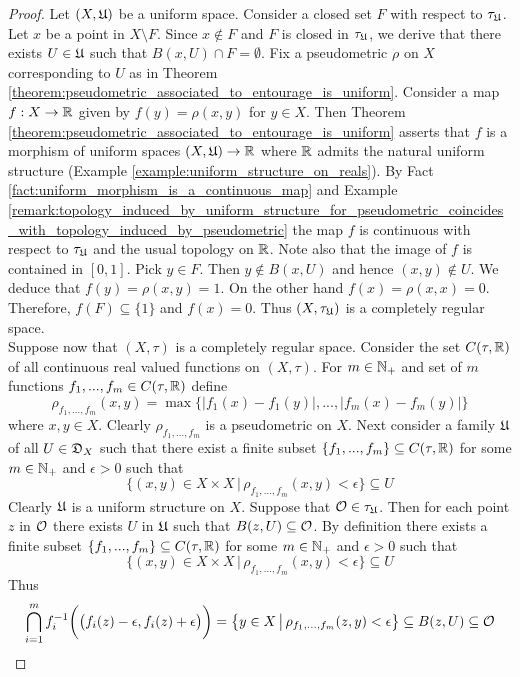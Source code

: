 \begin{proof}
Let $(X,{\mathfrak U})$ be a uniform space. Consider a closed set $F$ with respect to $\tau_{{\mathfrak U}}$. Let $x$ be a point in $X\setminus F$. Since $x \not \in F$ and $F$ is closed in $\tau_{{\mathfrak U}}$, we derive that there exists $U \in {\mathfrak U}$ such that $B(x,U)\cap F = \emptyset$. Fix a pseudometric $\rho$ on $X$ corresponding to $U$ as in Theorem \ref{theorem:pseudometric_associated_to_entourage_is_uniform}. Consider a map $f:X\rightarrow {\mathbb R}$ given by $f(y) = \rho(x,y)$ for $y\in X$. Then Theorem \ref{theorem:pseudometric_associated_to_entourage_is_uniform} asserts that $f$ is a morphism of uniform spaces $\left(X,{\mathfrak U}\right)\rightarrow {\mathbb R}$ where ${\mathbb R}$ admits the natural uniform structure (Example \ref{example:uniform_structure_on_reals}). By Fact \ref{fact:uniform_morphism_is_a_continuous_map} and Example \ref{remark:topology_induced_by_uniform_structure_for_pseudometric_coincides_with_topology_induced_by_pseudometric} the map $f$ is continuous with respect to $\tau_{{\mathfrak U}}$ and the usual topology on ${\mathbb R}$. Note also that the image of $f$ is contained in $[0,1]$. Pick $y\in F$. Then $y \not \in B(x,U)$ and hence $(x,y) \not \in U$. We deduce that $f(y) = \rho(x,y) = 1$. On the other hand $f(x) = \rho(x,x) = 0$. Therefore, $f(F) \subseteq \{1\}$ and $f(x) = 0$. Thus $(X,\tau_{{\mathfrak U}})$ is a completely regular space.\\
Suppose now that $(X,\tau)$ is a completely regular space. Consider the set $C(\tau,{\mathbb R})$ of all continuous real valued functions on $(X,\tau)$. For $m\in {\mathbb N}_+$ and set of $m$ functions $f_1,...,f_m\in C(\tau,{\mathbb R})$ define
$$\rho_{f_1,...,f_m}(x,y) = \max \big\{|f_1(x) - f_1(y)|,...,|f_m(x) - f_m(y)|\big\}$$
where $x,y\in X$. Clearly $\rho_{f_1,...,f_m}$ is a pseudometric on $X$. Next consider a family ${\mathfrak U}$ of all $U\in {\mathfrak D}_X$ such that there exist a finite subset $\{f_1,...,f_m\}\subseteq C(\tau,{\mathbb R})$ for some $m \in {\mathbb N}_+$ and $\epsilon > 0$ such that
$$\big\{(x,y)\in X\times X\,\big|\,\rho_{f_1,...,f_m}(x,y) < \epsilon\big\}\subseteq U$$
Clearly ${\mathfrak U}$ is a uniform structure on $X$. Suppose that ${\mathcal O} \in \tau_{{\mathfrak U}}$. Then for each point $z$ in ${\mathcal O}$ there exists $U$ in ${\mathfrak U}$ such that $B(z,U)\subseteq {\mathcal O}$. By definition there exists a finite subset $\{f_1,...,f_m\}\subseteq C(\tau,{\mathbb R})$ for some $m \in {\mathbb N}_+$ and $\epsilon > 0$ such that
$$\big\{(x,y)\in X\times X\,\big|\,\rho_{f_1,...,f_m}(x,y) < \epsilon\big\}\subseteq U$$
Thus
$$\bigcap_{i=1}^mf_i^{-1}\bigg(\big(f_i(z) - \epsilon, f_i(z) + \epsilon\big)\bigg) = \big\{y\in X \,\big|\, \rho_{f_1,...,f_m}(z,y) < \epsilon\big\} \subseteq B(z,U)\subseteq {\mathcal O}$$

\end{proof}
